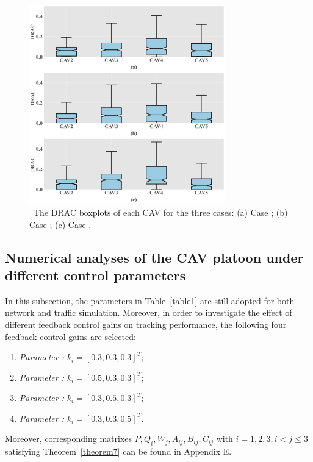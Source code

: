\documentclass[journal]{IEEEtran}
\begin{document}
\begin{figure}
  \centering
  \includegraphics[width=8.5cm]{figs/fig8.png}
  \caption{~The DRAC boxplots of each CAV for the three cases: (a) Case \uppercase\expandafter{}; (b) Case \uppercase\expandafter{}; (c) Case \uppercase\expandafter{}.}
  \label{fig8}
\end{figure}

\subsection{Numerical analyses of the CAV platoon under different control parameters}
\label{Section 5.3}

In this subsection, the parameters in Table~\ref{table1} are still adopted for both network and traffic simulation. Moreover, in order to investigate the effect of different feedback control gains on tracking performance, the following four feedback control gains are selected:
\begin{enumerate}
  \item \textit{Parameter \uppercase\expandafter{}:} $ {k_i} = {[0.3,0.3,0.3]^T} $;
  \item \textit{Parameter \uppercase\expandafter{}:} $ {k_i} = {[0.5,0.3,0.3]^T} $;
  \item \textit{Parameter \uppercase\expandafter{}:} $ {k_i} = {[0.3,0.5,0.3]^T} $;
  \item \textit{Parameter \uppercase\expandafter{}:} $ {k_i} = {[0.3,0.3,0.5]^T} $.
\end{enumerate}
Moreover, corresponding matrixes $P,Q_i,W_j,A_{ij},B_{ij},C_{ij}$ with $i=1,2,3,i<j\le3 $satisfying Theorem~\ref{theorem7} can be found in Appendix E.
\end{document}
